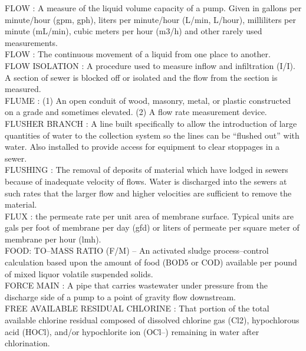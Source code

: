 \vspace{0.15cm}
FLOW :   A measure of the liquid volume capacity of a pump. Given in gallons per minute/hour (gpm, gph), liters per minute/hour (L/min, L/hour), milliliters per minute (mL/min), cubic meters per hour (m3/h) and other rarely used measurements.\\
\vspace{0.15cm}
FLOW :  The continuous movement of a liquid from one place to another. \\
\vspace{0.15cm}
FLOW ISOLATION :  A procedure used to measure inflow and infiltration (I/I). A section of sewer is blocked off or isolated and the flow from the section is measured. \\
\vspace{0.15cm}
FLUME :  (1) An open conduit of wood, masonry, metal, or plastic constructed on a grade and sometimes elevated. (2) A flow rate measurement device. \\
\vspace{0.15cm}
FLUSHER BRANCH :  A line built specifically to allow the introduction of large quantities of water to the collection system so the lines can be “flushed out” with water. Also installed to provide access for equipment to clear stoppages in a sewer. \\
\vspace{0.15cm}
FLUSHING :  The removal of deposits of material which have lodged in sewers because of inadequate velocity of flows. Water is discharged into the sewers at such rates that the larger flow and higher velocities are sufficient to remove the material. \\
\vspace{0.15cm}
FLUX :  the permeate rate per unit area of membrane surface. Typical units are gals per foot of membrane per day (gfd) or liters of permeate per square meter of membrane per hour (lmh).\\
\vspace{0.15cm}
FOOD: TO–MASS RATIO (F/M) – An activated sludge process–control calculation based upon the amount of food (BOD5 or COD) available per pound of mixed liquor volatile suspended solids. \\
\vspace{0.15cm}
FORCE MAIN :  A pipe that carries wastewater under pressure from the discharge side of a pump to a point of gravity flow downstream.\\
\vspace{0.15cm}
FREE AVAILABLE RESIDUAL CHLORINE :  That portion of the total available chlorine residual composed of dissolved chlorine gas (Cl2), hypochlorous acid (HOCl), and/or hypochlorite ion (OCl–) remaining in water after chlorination.\\
